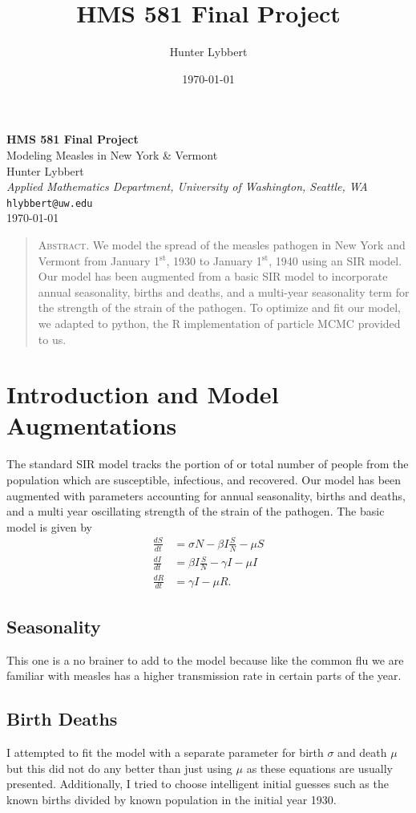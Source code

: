 \documentclass[11pt]{amsart}
\title{HMS 581 Final Project}
\author{Hunter Lybbert}
\date{\today}
\begin{document}
\begin{center}
    {\LARGE \textbf{HMS 581 Final Project}}\\[1ex]
    {\large Modeling Measles in New York \& Vermont}\\[4ex]
    {\Large Hunter Lybbert}\\[2ex]
    \textit{Applied Mathematics Department, University of Washington, Seattle, WA}\\[1ex]
    \texttt{hlybbert@uw.edu}\\[1ex]
    \today
\end{center}

\vspace{2ex}
\begin{quote}
A\textsc{bstract.}
\small We model the spread of the measles pathogen in New York and Vermont from January 1$^{\text{st}}$, 1930 to January 1$^{\text{st}}$, 1940 using an SIR model.
Our model has been augmented from a basic SIR model to incorporate annual seasonality, births and deaths, and a multi-year seasonality term for the strength of the strain of the pathogen.
To optimize and fit our model, we adapted to python, the R implementation of particle MCMC provided to us.
\end{quote}

\section{Introduction and Model Augmentations}\label{sec:augmentations}
The standard SIR model tracks the portion of or total number of people from the population which are susceptible, infectious, and recovered.
Our model has been augmented with parameters accounting for annual seasonality, births and deaths, and a multi year oscillating strength of the strain of the pathogen. The basic model is given by
\begin{align*}
\frac{dS}{dt} &= \sigma N - \beta I \frac S N - \mu S \\
\frac{dI}{dt} &= \beta I \frac S N - \gamma I - \mu I \\
\frac{dR}{dt} &= \gamma I - \mu R.
\end{align*}
\subsection{Seasonality} This one is a no brainer to add to the model because like the common flu we are familiar with measles has a higher transmission rate in certain parts of the year.
\subsection{Birth Deaths}
I attempted to fit the model with a separate parameter for birth $\sigma$ and death $\mu$ but this did not do any better than just using $\mu$ as these equations are usually presented.
Additionally, I tried to choose intelligent initial guesses such as the known births divided by known population in the initial year 1930.
\end{document}
